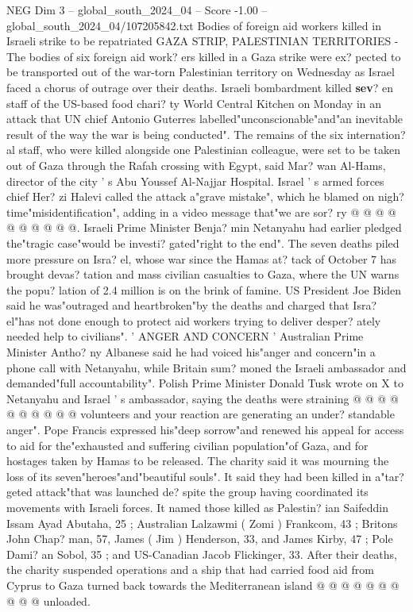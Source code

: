 \begin{textsample}{NEG Dim 3 – global\_south\_2024\_04 – Score -1.00 – global\_south\_2024\_04/107205842.txt}  \label{ex:f3_neg_261}
Bodies of foreign aid workers killed in Israeli strike to be repatriated GAZA STRIP, PALESTINIAN TERRITORIES - The bodies of six foreign aid work? ers killed in a Gaza strike were ex? pected to be transported out of the war-torn Palestinian territory on Wednesday as Israel faced a chorus of outrage over their deaths.
Israeli bombardment killed \textbf{sev}? en staff of the US-based food chari? ty World Central Kitchen on Monday in an attack that UN chief Antonio Guterres labelled"unconscionable"and"an inevitable result of the way the war is being conducted".
The remains of the six internation? al staff, who were killed alongside one Palestinian colleague, were set to be taken out of Gaza through the Rafah crossing with Egypt, said Mar? wan Al-Hams, director of the city ' s Abu Youssef Al-Najjar Hospital.
Israel ' s armed forces chief Her? zi Halevi called the attack a"grave mistake", which he blamed on nigh? time"misidentification", adding in a video message that"we are sor? ry @ @ @ @ @ @ @ @ @ @.
Israeli Prime Minister Benja? min Netanyahu had earlier pledged the"tragic case"would be investi? gated"right to the end".
The seven deaths piled more pressure on Isra? el, whose war since the Hamas at? tack of October 7 has brought devas? tation and mass civilian casualties to Gaza, where the UN warns the popu? lation of 2.4 million is on the brink of famine.
US President Joe Biden said he was"outraged and heartbroken"by the deaths and charged that Isra? el"has not done enough to protect aid workers trying to deliver desper? ately needed help to civilians". ' ANGER AND CONCERN ' Australian Prime Minister Antho? ny Albanese said he had voiced his"anger and concern"in a phone call with Netanyahu, while Britain sum? moned the Israeli ambassador and demanded"full accountability".
Polish Prime Minister Donald Tusk wrote on X to Netanyahu and Israel ' s ambassador, saying the deaths were straining @ @ @ @ @ @ @ @ @ @ volunteers and your reaction are generating an under? standable anger".
Pope Francis expressed his"deep sorrow"and renewed his appeal for access to aid for the"exhausted and suffering civilian population"of Gaza, and for hostages taken by Hamas to be released.
The charity said it was mourning the loss of its seven"heroes"and"beautiful souls".
It said they had been killed in a"tar? geted attack"that was launched de? spite the group having coordinated its movements with Israeli forces.
It named those killed as Palestin? ian Saifeddin Issam Ayad Abutaha, 25 ; Australian Lalzawmi ( Zomi ) Frankcom, 43 ; Britons John Chap? man, 57, James ( Jim ) Henderson, 33, and James Kirby, 47 ; Pole Dami? an Sobol, 35 ; and US-Canadian Jacob Flickinger, 33.
After their deaths, the charity suspended operations and a ship that had carried food aid from Cyprus to Gaza turned back towards the Mediterranean island @ @ @ @ @ @ @ @ @ @ unloaded.

\end{textsample}
